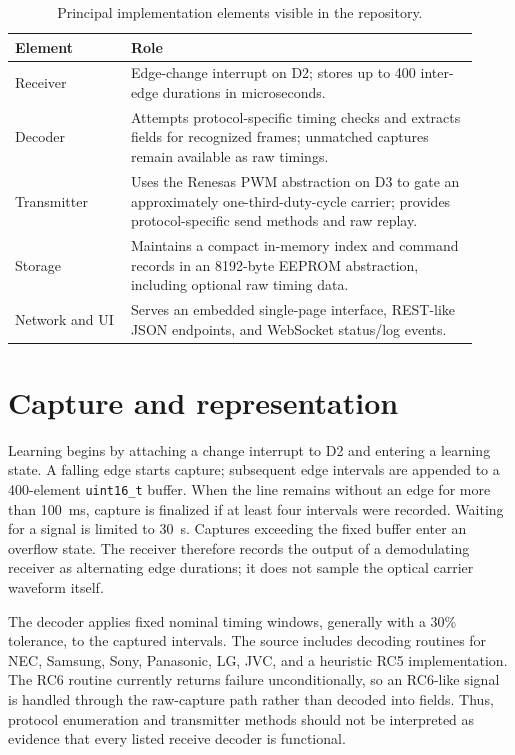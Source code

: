 \documentclass[11pt]{article}
\begin{document}
\begin{table}[ht]
\centering
\caption{Principal implementation elements visible in the repository.}
\label{tab:components}
\begin{tabular}{>{\raggedright\arraybackslash}p{0.23\linewidth} >{\raggedright\arraybackslash}p{0.69\linewidth}}
\toprule
Element & Role \\
\midrule
Receiver & Edge-change interrupt on D2; stores up to 400 inter-edge durations in microseconds. \\
Decoder & Attempts protocol-specific timing checks and extracts fields for recognized frames; unmatched captures remain available as raw timings. \\
Transmitter & Uses the Renesas PWM abstraction on D3 to gate an approximately one-third-duty-cycle carrier; provides protocol-specific send methods and raw replay. \\
Storage & Maintains a compact in-memory index and command records in an 8192-byte EEPROM abstraction, including optional raw timing data. \\
Network and UI & Serves an embedded single-page interface, REST-like JSON endpoints, and WebSocket status/log events. \\
\bottomrule
\end{tabular}
\end{table}

\section{Capture and representation}
Learning begins by attaching a change interrupt to D2 and entering a learning state. A falling edge starts capture; subsequent edge intervals are appended to a 400-element \texttt{uint16\_t} buffer. When the line remains without an edge for more than 100~ms, capture is finalized if at least four intervals were recorded. Waiting for a signal is limited to 30~s. Captures exceeding the fixed buffer enter an overflow state. The receiver therefore records the output of a demodulating receiver as alternating edge durations; it does not sample the optical carrier waveform itself.

The decoder applies fixed nominal timing windows, generally with a 30\% tolerance, to the captured intervals. The source includes decoding routines for NEC, Samsung, Sony, Panasonic, LG, JVC, and a heuristic RC5 implementation. The RC6 routine currently returns failure unconditionally, so an RC6-like signal is handled through the raw-capture path rather than decoded into fields. Thus, protocol enumeration and transmitter methods should not be interpreted as evidence that every listed receive decoder is functional.
\end{document}
